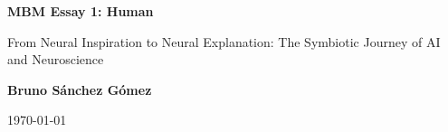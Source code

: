 \documentclass[11pt,a4paper]{article}
\author{Bruno Sánchez Gómez}
\date{\today}
\begin{document}
\begin{titlepage}
    \centering
    \vspace*{2cm}
    {\Huge \bfseries MBM Essay 1: Human \par}
    \vspace{2cm}
    {\huge From Neural Inspiration to Neural Explanation: The Symbiotic Journey of AI and Neuroscience \par}
    \vspace{10cm}
    {\large \textbf{Bruno Sánchez Gómez} \par}
    \vfill
    {\large \today \par}
\end{titlepage}





\nocite{*}
\printbibliography%
\end{document}
